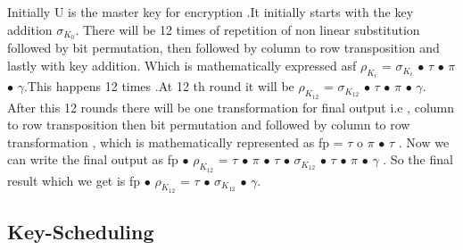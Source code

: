 \documentclass{transcrypto}
\begin{document}
Initially U is the master key for encryption .It initially starts with the key addition $\sigma _{K_{0}}$. There will be 12 times of repetition of non linear substitution  followed by bit permutation, then followed by column to row transposition and lastly with key addition. Which is mathematically expressed asf $\rho _{K_i}$ = $\sigma _{K_i}$ $\bullet$ $\tau$ $\bullet$ $\pi$ $\bullet$ $\gamma$.This happens 12 times .At 12 th round it will be $\rho_{K_{12}}$ = $\sigma _{K_{12}}$ $\bullet$ $\tau$ $\bullet$ $\pi$ $\bullet$ $\gamma$. After this 12 rounds there will be one transformation for final output i.e , column to row transposition then bit permutation and followed by column to row transformation , which is mathematically represented as fp = $\tau$ o $\pi$ $\bullet$ $\tau$ . Now we can write the final output as fp $\bullet$ $\rho _{K_{12}}$ = $\tau$ $\bullet$ $\pi$ $\bullet$ $\tau$ $\bullet$  $\sigma _{K_{12}}$ $\bullet$ $\tau$ $\bullet$ $\pi$ $\bullet$ $\gamma$ . So the final result which we get is  fp $\bullet$ $\rho _{K_{12}}$ = $\tau$ $\bullet$ $\sigma _{K_{12}}$ $\bullet$ $\gamma$.


	\subsection{Key-Scheduling}
\end{document}
